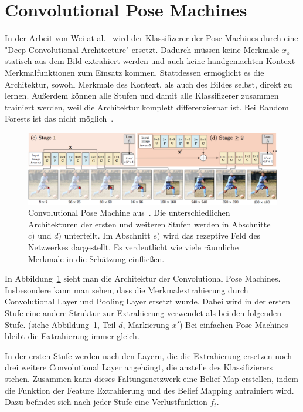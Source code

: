 \documentclass[journal, a4paper]{IEEEtran}
\begin{document}
\section{Convolutional Pose Machines}\label{subsec:Intro}
	In der Arbeit von Wei at al.~\cite{conv_pose} wird der Klassifizerer der Pose Machines durch eine "Deep Convolutional Architecture" ersetzt. Dadurch müssen keine Merkmale $x_z$ statisch aus dem Bild extrahiert werden und auch keine handgemachten Kontext-Merkmalfunktionen zum Einsatz kommen. Stattdessen ermöglicht es die Architektur, sowohl Merkmale des Kontext, als auch des Bildes selbst, direkt zu lernen. Außerdem können alle Stufen und damit alle Klassifizerer zusammen trainiert werden, weil die Architektur komplett differenzierbar ist. Bei Random Forests ist das nicht möglich~\cite{ramakrishna2014pose}.

        \begin{figure}[!bth]
                \begin{center}
                \includegraphics[width=1\columnwidth]{convolutional_pose_machine.png}
                \caption{Convolutional Pose Machine aus~\cite{conv_pose}. Die unterschiedlichen Architekturen der ersten und weiteren Stufen werden in Abschnitte $c)$ und $d)$ unterteilt. Im Abschnitt $e)$ wird das rezeptive Feld des Netzwerkes dargestellt. Es verdeutlicht wie viele räumliche Merkmale in die Schätzung einfließen.}
                \label{fig:conv_pose_machine}
                \end{center}
        \end{figure}

        In Abbildung~\ref{fig:conv_pose_machine} sieht man die Architektur der Convolutional Pose Machines. Insbesondere kann man sehen, dass die Merkmalextrahierung durch Convolutional Layer und Pooling Layer ersetzt wurde. Dabei wird in der ersten Stufe eine andere Struktur zur Extrahierung verwendet als bei den folgenden Stufe. (siehe Abbildung~\ref{fig:conv_pose_machine}, Teil $d$, Markierung $x'$) Bei einfachen Pose Machines bleibt die Extrahierung immer gleich. 

        In der ersten Stufe werden nach den Layern, die die Extrahierung ersetzen noch drei weitere Convolutional Layer angehängt, die anstelle des Klassifizierers stehen. Zusammen kann dieses Faltungsnetzwerk eine Belief Map erstellen, indem die Funktion der Feature Extrahierung und des Belief Mapping antrainiert wird. Dazu befindet sich nach jeder Stufe eine Verlustfunktion $f_{t}$.
\end{document}
